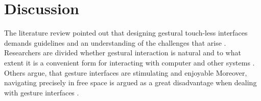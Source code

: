 \chapter{Discussion}
\label{chap:discussion}







The literature review pointed out that designing gestural touch-less interfaces demands guidelines and an understanding of the challenges that arise \cite{NormanNielsen2010, Malizia2012, Montero2010}. Researchers are divided whether gestural interaction is natural and to what extent it is a convenient form for interacting with computer and other systems \cite{Montero2010, Malizia2012, Norman2010, ParkWonkyu2013, Riener2012}. Others argue, that gesture interfaces are stimulating and enjoyable \cite{Loehmann2013, RenGang2013} Moreover, navigating precisely in free space is argued as a great disadvantage when dealing with gesture interfaces \cite{Ni2011, Siek2005}.

